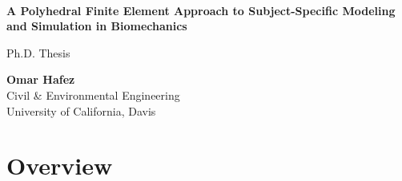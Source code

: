 \documentclass[12pt]{article}
\begin{document}
\begin{titlepage}
\ 
\vspace{7cm}\begin{center}
   {\bf\LARGE A Polyhedral Finite Element Approach to Subject-Specific Modeling and Simulation in Biomechanics}
\end{center}



\vspace{1cm}
\begin{center} 

{\large Ph.D. Thesis }

\vspace{1.3cm}
{\bf\large Omar Hafez}\\%

{Civil \& Environmental Engineering}\\
{University of California, Davis}\end{center}

\end{titlepage}


\thispagestyle{empty} 
\setcounter{tocdepth}{2} %

\tableofcontents

\newpage
\setcounter{page}{1}
\section{Overview}
\label{Overview}
~\cite{heartmech}~\cite{newheartpaper}~\cite{vorocrust,simpleware,persson}
\end{document}
